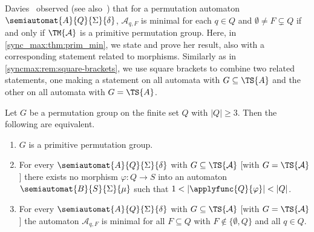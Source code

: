 
Davies~\cite[Cor.~3.3]{DBLP:journals/mst/Davies18}
observed (see also~\cite[Cor.~4.2.4]{DBLP:phd/basesearch/Davies19}) 
that for a permutation automaton $\semiautomat{A}{Q}{\Sigma}{\delta}$, $\mathcal A_{q, F}$
is minimal for each $q \in Q$ and $\emptyset \ne F \subsetneq Q$
if and only if $\TM{\mathcal A}$ is a primitive permutation group.
Here, in \cref{sync_max:thm:prim_min}, 
we state and prove her result, also with a corresponding statement related
to morphisms.
Similarly as in \cref{syncmax:rem:square-brackets},
we use square brackets
to combine two related statements, one making
a statement on all  automata with $G \subseteq \TS{A}$ 
and the other on all  automata with $G = \TS{A}$.

\begin{theorem}
	\label{sync_max:thm:prim_min}
	Let $G$ be a permutation group on the finite set $Q$ 
	with $|Q| \ge 3$. Then the following are equivalent.	
	\begin{enumerate}
		\item \label{sync_max:appl:prim} $G$
		is a primitive permutation group.		
	
		\item \label{sync_max:appl:hom}
		For every $\semiautomat{A}{Q}{\Sigma}{\delta}$
		with $G \subseteq \TS{\mathcal A}$ [with $G = \TS{\mathcal A}$]
		there exists no morphism $\varphi \colon Q \to S$
		into an automaton  $\semiautomat{B}{S}{\Sigma}{\mu}$
		such that $1 < |\applyfunc{Q}{\varphi}| < |Q|$.
				
		\item \label{sync_max:appl:min} 
		For every $\semiautomat{A}{Q}{\Sigma}{\delta}$
		with $G \subseteq \TS{\mathcal A}$ [with $G = \TS{\mathcal A}$]
		the automaton $\mathcal A_{q, F}$ is minimal for all $F \subseteq Q$ with $F \notin \{\emptyset, Q\}$ and all $q \in Q$.		
	\end{enumerate}	
\end{theorem}
